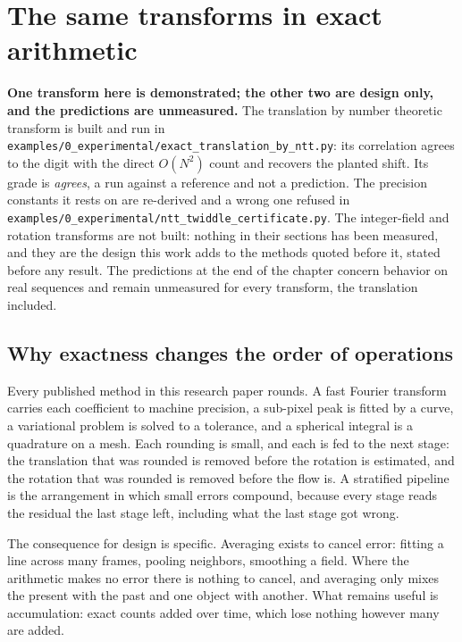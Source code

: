 \chapter{The same transforms in exact arithmetic}

\textbf{One transform here is demonstrated; the other two are design only, and the predictions are
unmeasured.} The translation by number theoretic transform is built and run in
\texttt{examples/\allowbreak{}0\_experimental/\allowbreak{}exact\_translation\_by\_ntt.py}: its
correlation agrees to the digit with the direct \(O(N^2)\) count and recovers the planted shift. Its
grade is \emph{agrees}, a run against a reference and not a prediction. The precision constants it rests
on are re-derived and a wrong one refused in
\texttt{examples/\allowbreak{}0\_experimental/\allowbreak{}ntt\_twiddle\_certificate.py}. The
integer-field and rotation transforms are not built: nothing in their sections has been measured, and
they are the design this work adds to the methods quoted before it, stated before any result. The
predictions at the end of the chapter concern behavior on real sequences and remain unmeasured for
every transform, the translation included.

\section{Why exactness changes the order of operations}

Every published method in this research paper rounds. A fast Fourier transform carries each coefficient to
machine precision, a sub-pixel peak is fitted by a curve, a variational problem is solved to a
tolerance, and a spherical integral is a quadrature on a mesh. Each rounding is small, and each is
fed to the next stage: the translation that was rounded is removed before the rotation is estimated,
and the rotation that was rounded is removed before the flow is. A stratified pipeline is the
arrangement in which small errors compound, because every stage reads the residual the last stage
left, including what the last stage got wrong.

The consequence for design is specific. Averaging exists to cancel error: fitting a line across many
frames, pooling neighbors, smoothing a field. Where the arithmetic makes no error there is nothing to
cancel, and averaging only mixes the present with the past and one object with another. What remains
useful is accumulation: exact counts added over time, which lose nothing however many are added.

